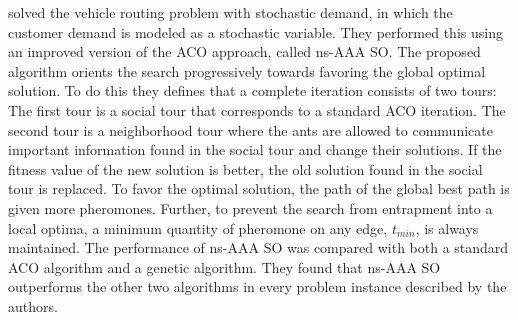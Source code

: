 \citet{tripathi09} solved the vehicle routing problem with stochastic demand, in which the customer demand is modeled as a stochastic variable. They performed this using an improved version of the ACO approach, called ns-AAA SO. The proposed algorithm orients the search progressively towards favoring the global optimal solution. To do this they defines that a complete iteration consists of two tours: The first tour is a social tour that corresponds to a standard ACO iteration. The second tour is a neighborhood tour where the ants are allowed to communicate important information found in the social tour and change their solutions. If the fitness value of the new solution is better, the old solution found in the social tour is replaced. To favor the optimal solution, the path of the global best path is given more pheromones. Further, to prevent the search from entrapment into a local optima, a minimum quantity of pheromone on any edge, $t_{min}$, is always maintained. The performance of ns-AAA SO was compared with both a standard ACO algorithm and a genetic algorithm. They found that ns-AAA SO outperforms the other two algorithms in every problem instance described by the authors.


